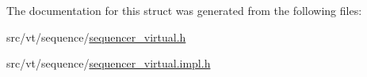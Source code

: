 The documentation for this struct was generated from the following files\+:\begin{DoxyCompactItemize}
\item 
src/vt/sequence/\hyperlink{sequencer__virtual_8h}{sequencer\+\_\+virtual.\+h}\item 
src/vt/sequence/\hyperlink{sequencer__virtual_8impl_8h}{sequencer\+\_\+virtual.\+impl.\+h}\end{DoxyCompactItemize}
